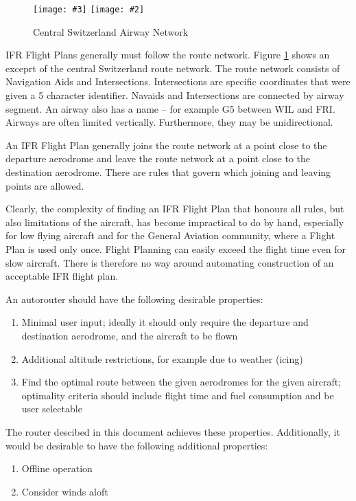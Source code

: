 \documentclass[a4paper,10pt,pdftex]{article}
\newcommand{\jnxfig}[3][]{\ifmypdf\texttt{[image: \#3]}
  \else\texttt{[image: \#2]}\fi}
\begin{document}
\noindent\begin{figure}[!htbp]
  \begin{center}
    \jnxfig[scale=0.7]{routenetwork.eps}{routenetwork.pdf}
    \caption{Central Switzerland Airway Network}
    \label{fig:routenetwork}
  \end{center}
\end{figure}

IFR Flight Plans generally must follow the route network. Figure
\ref{fig:routenetwork} shows an exceprt of the central Switzerland
route network. The route network consists of Navigation Aids and
Intersections. Intersections are specific coordinates that were given
a 5 character identifier. Navaids and Intersections are connected by
airway segment. An airway also has a name -- for example G5 between
WIL and FRI. Airways are often limited vertically. Furthermore, they
may be unidirectional.

An IFR Flight Plan generally joins the route network at a point close
to the departure aerodrome and leave the route network at a point
close to the destination aerodrome. There are rules that govern which
joining and leaving points are allowed.

Clearly, the complexity of finding an IFR Flight Plan that honours all
rules, but also limitations of the aircraft, has become impractical to
do by hand, especially for low flying aircraft and for the General
Aviation community, where a Flight Plan is used only once. Flight
Planning can easily exceed the flight time even for slow
aircraft. There is therefore no way around automating construction of
an acceptable IFR flight plan.

An autorouter should have the following desirable properties:
\begin{enumerate}
\item Minimal user input; ideally it should only require the departure
  and destination aerodrome, and the aircraft to be flown
\item Additional altitude restrictions, for example due to weather (icing)
\item Find the optimal route between the given aerodromes for the
  given aircraft; optimality criteria should include flight time and
  fuel consumption and be user selectable
\end{enumerate}

The router descibed in this document achieves these
properties. Additionally, it would be desirable to have the following
additional properties:
\begin{enumerate}
\item Offline operation
\item Consider winds aloft
\end{enumerate}
\end{document}
